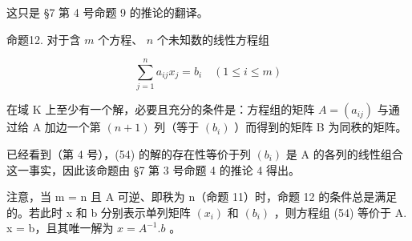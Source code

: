 这只是 §7 第 4 号命题 9 的推论的翻译。

命题12. 对于含 \(m\) 个方程、 \(n\) 个未知数的线性方程组

\[
\sum_ {j = 1} ^ {n} a _ {i j} x _ {j} = b _ {i} \quad (1 \leqslant i \leqslant m)\tag{54}
\]

在域 K 上至少有一个解，必要且充分的条件是：方程组的矩阵 \(A = (a_{ij})\) 与通过给 A 加边一个第 \((n + 1)\) 列（等于 \((b_{i})\) ）而得到的矩阵 B 为同秩的矩阵。

已经看到（第 4 号），(54) 的解的存在性等价于列 \((b_{i})\) 是 A 的各列的线性组合这一事实，因此该命题由 §7 第 3 号命题 4 的推论 4 得出。

注意，当 m = n 且 A 可逆、即秩为 n（命题 11）时，命题 12 的条件总是满足的。若此时 x 和 b 分别表示单列矩阵 \((x_{i})\) 和 \((b_{i})\) ，则方程组 (54) 等价于 A. x = b，且其唯一解为 \(x = A^{-1}.b\) 。

